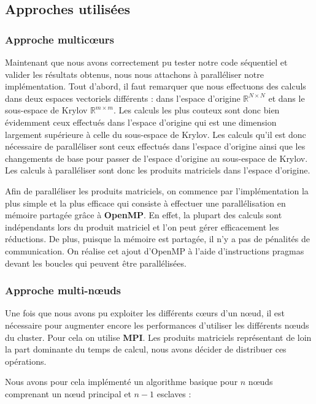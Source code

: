 \documentclass[11pt,a4paper]{article}
\begin{document}
	\subsection{Approches utilisées}

	\subsubsection{Approche multic\oe{}urs}

		Maintenant que nous avons correctement pu tester notre code séquentiel et valider les résultats obtenus, nous nous attachons à paralléliser notre implémentation. Tout d'abord, il faut remarquer que nous effectuons des calculs dans deux espaces vectoriels différents : dans l'espace d'origine $\mathbb{R}^{N\times N}$ et dans le sous-espace de Krylov $\mathbb{R}^{m\times m}$. Les calculs les plus couteux sont donc bien évidemment ceux effectués dans l'espace d'origine qui est une dimension largement supérieure à celle du sous-espace de Krylov. Les calculs qu'il est donc nécessaire de paralléliser sont ceux effectués dans l'espace d'origine ainsi que les changements de base pour passer de l'espace d'origine au sous-espace de Krylov. Les calculs à paralléliser sont donc les produits matriciels dans l'espace d'origine.

		Afin de paralléliser les produits matriciels, on commence par l'implémentation la plus simple et la plus efficace qui consiste à effectuer une parallélisation en mémoire partagée grâce à \textbf{OpenMP}. En effet, la plupart des calculs sont indépendants lors du produit matriciel et l'on peut gérer efficacement les réductions. De plus, puisque la mémoire est partagée, il n'y a pas de pénalités de communication. On réalise cet ajout d'OpenMP à l'aide d'instructions pragmas devant les boucles qui peuvent être parallélisées.
		
		\subsubsection{Approche multi-n\oe{}uds}

		Une fois que nous avons pu exploiter les différents c\oe{}urs d'un n\oe{}ud, il est nécessaire pour augmenter encore les performances d'utiliser les différents n\oe{}uds du cluster. Pour cela on utilise \textbf{MPI}. Les produits matriciels représentant de loin la part dominante du temps de calcul, nous avons décider de distribuer ces opérations.

		Nous avons pour cela implémenté un algorithme basique pour $n$ nœuds comprenant un n\oe{}ud principal et $n-1$ esclaves :
\end{document}
